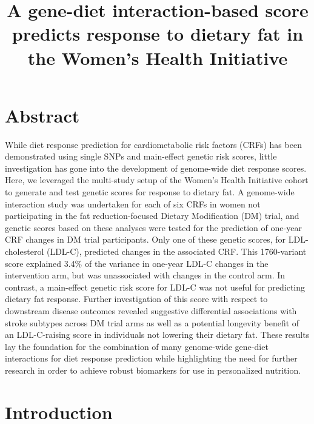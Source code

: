 \documentclass[]{article}
\title{A gene-diet interaction-based score predicts response to dietary fat in
the Women's Health Initiative}
\author{}
\date{}
\begin{document}
\maketitle

\hypertarget{abstract}{%
\section{Abstract}\label{abstract}}

While diet response prediction for cardiometabolic risk factors (CRFs)
has been demonstrated using single SNPs and main-effect genetic risk
scores, little investigation has gone into the development of
genome-wide diet response scores. Here, we leveraged the multi-study
setup of the Women's Health Initiative cohort to generate and test
genetic scores for response to dietary fat. A genome-wide interaction
study was undertaken for each of six CRFs in women not participating in
the fat reduction-focused Dietary Modification (DM) trial, and genetic
scores based on these analyses were tested for the prediction of
one-year CRF changes in DM trial participants. Only one of these genetic
scores, for LDL-cholesterol (LDL-C), predicted changes in the associated
CRF. This 1760-variant score explained 3.4\% of the variance in one-year
LDL-C changes in the intervention arm, but was unassociated with changes
in the control arm. In contrast, a main-effect genetic risk score for
LDL-C was not useful for predicting dietary fat response. Further
investigation of this score with respect to downstream disease outcomes
revealed suggestive differential associations with stroke subtypes
across DM trial arms as well as a potential longevity benefit of an
LDL-C-raising score in individuals not lowering their dietary fat. These
results lay the foundation for the combination of many genome-wide
gene-diet interactions for diet response prediction while highlighting
the need for further research in order to achieve robust biomarkers for
use in personalized nutrition.

\hypertarget{introduction}{%
\section{Introduction}\label{introduction}}
\end{document}

